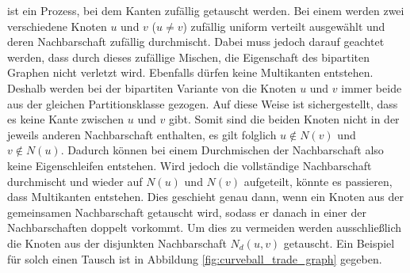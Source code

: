\fett{\cb{}} ist  ein Prozess, bei dem Kanten zufällig getauscht werden. Bei einem \ct{} werden
zwei verschiedene Knoten $u$ und $v$ ($u\neq v$) zufällig uniform verteilt ausgewählt und deren Nachbarschaft
zufällig durchmischt. 
Dabei muss jedoch darauf geachtet werden, dass durch dieses zufällige Mischen, die Eigenschaft
des bipartiten Graphen nicht verletzt wird. Ebenfalls dürfen keine Multikanten entstehen.
Deshalb werden bei der bipartiten Variante  von \cb{}
die Knoten $u$ und $v$ immer beide aus der gleichen Partitionsklasse gezogen.
Auf diese Weise ist sichergestellt, dass
es keine Kante zwischen $u$ und $v$ gibt. Somit sind die beiden Knoten nicht in der jeweils anderen Nachbarschaft
enthalten, es gilt folglich $u\notin N(v)$ und $v\notin N(u)$. Dadurch
können bei einem Durchmischen der Nachbarschaft also keine Eigenschleifen entstehen.
Wird jedoch die vollständige Nachbarschaft durchmischt und wieder auf $ N(u)$ und $N(v)$ 
aufgeteilt, könnte es passieren, 
dass Multikanten entstehen. Dies geschieht
genau dann, wenn ein Knoten aus der gemeinsamen Nachbarschaft getauscht wird, sodass er danach in 
einer der Nachbarschaften doppelt vorkommt.
Um dies zu vermeiden werden ausschließlich die Knoten aus der disjunkten Nachbarschaft $N_{d}(u,v)$ getauscht.
Ein Beispiel für solch einen Tausch ist in Abbildung \ref{fig:curveball_trade_graph} gegeben.
%
%
%
